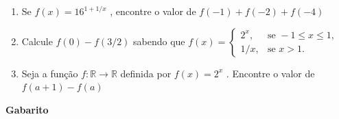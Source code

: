 \begin{enumerate}
		\item Se $f(x) = 16^{1+1/x}$ , encontre o valor de $f(-1) + f(-2) + f(-4)$

		\item Calcule $f(0)-f (3/2)$ sabendo que $f(x)=\begin{cases}
		2^x,&\mbox{se }-1\leq x\leq 1,\\
		1/x,&\mbox{se }x>1.
		\end{cases}$

		\item Seja a função $f:\mathbb{R}\to\mathbb{R}$ definida por $f(x) = 2^x$ . Encontre o valor de $f(a+1)-f(a)$

\end{enumerate}


		\begin{center}
			\textbf{Gabarito}
		\end{center}

